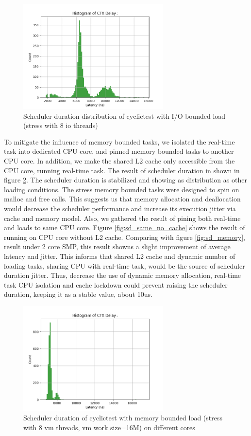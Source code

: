 \documentclass[conference]{IEEEtran}
\begin{document}
    \begin{figure} \centering \includegraphics[width=3in]{img/sd-io.png} \caption{Scheduler duration distribution of
    cyclictest with I/O bounded load (stress with 8 io threads)} \label{fig:sd_io} \end{figure}

    To mitigate the influence of memory bounded tasks, we isolated the real-time task into dedicated CPU core, and
    pinned memory bounded tasks to another CPU core. In addition, we make the shared L2 cache only accessible from the
    CPU core, running real-time task. The result of scheduler duration in shown in figure \ref{fig:sd_iso}. The
    scheduler duration is stabilized and showing as distribution as other loading conditions. The stress memory bounded
    tasks were designed to spin on malloc and free calls. This suggests us that memory allocation and deallocation would
    decrease the scheduler performance and increase its execution jitter via cache and memory model. Also, we gathered
    the result of pining both real-time and loads to same CPU core. Figure \ref{fig:sd_same_no_cache} shows the result
    of running on CPU core without L2 cache.  Comparing with figure \ref{fig:sd_memory}, result under 2 core SMP, this
    result showns a slight improvement of average latency and jitter. This informs that shared L2 cache and dynamic
    number of loading tasks, sharing CPU with real-time task, would be the source of scheduler duration jitter. Thus,
    decrease the use of dynamic memory allocation, real-time task CPU isolation and cache lockdown could prevent raising
    the scheduler duration, keeping it as a stable value, about 10us.

    \begin{figure} \centering \includegraphics[width=3in]{img/sd-iso.png} \caption{Scheduler duration of cyclictest with
    memory bounded load (stress with 8 vm threads, vm work size=16M) on different cores} \label{fig:sd_iso} \end{figure}
\end{document}
